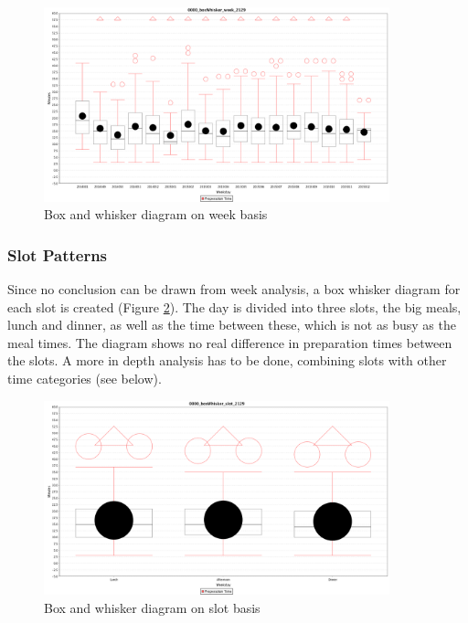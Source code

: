 \begin{figure}[h]
\begin{center}
\includegraphics[width=10cm]{images/0000_boxWhisker_week_2129.png}
\caption{Box and whisker diagram on week basis}
\label{fig:0000_boxWhisker_week_2129}
\end{center}
\end{figure}

\subsubsection{Slot Patterns}
Since no conclusion can be drawn from week analysis, a box whisker diagram for each slot is created (Figure \ref{fig:0000_boxWhisker_slot_2129}). The day is divided into three slots, the big meals, lunch and dinner, as well as the time between these, which is not as busy as the meal times. The diagram shows no real difference in preparation times between the slots. A more in depth analysis has to be done, combining slots with other time categories (see below).

\begin{figure}[h]
\begin{center}
\includegraphics[width=10cm]{images/0000_boxWhisker_slot_2129.png}
\caption{Box and whisker diagram on slot basis}
\label{fig:0000_boxWhisker_slot_2129}
\end{center}
\end{figure}

